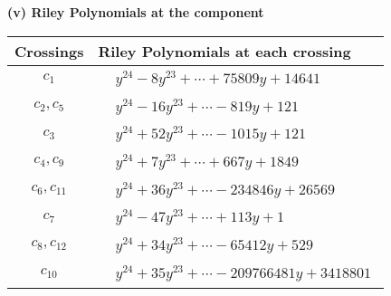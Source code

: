 \documentclass[1p]{elsarticle_modified}
\theoremstyle{definition}
\begin{document}
\newpage\renewcommand{\arraystretch}{1}
\flushleft \textbf{(v) Riley Polynomials at the component}\newline \\
\begin{tabular}{m{50pt}|m{274pt}}
Crossings & \hspace{64pt}Riley Polynomials at each crossing \\
\hline $$\begin{aligned}c_{1}\end{aligned}$$&$\begin{aligned}
&y^{24}-8 y^{23}+\cdots+75809 y+14641
\end{aligned}$\\
\hline $$\begin{aligned}c_{2},c_{5}\end{aligned}$$&$\begin{aligned}
&y^{24}-16 y^{23}+\cdots-819 y+121
\end{aligned}$\\
\hline $$\begin{aligned}c_{3}\end{aligned}$$&$\begin{aligned}
&y^{24}+52 y^{23}+\cdots-1015 y+121
\end{aligned}$\\
\hline $$\begin{aligned}c_{4},c_{9}\end{aligned}$$&$\begin{aligned}
&y^{24}+7 y^{23}+\cdots+667 y+1849
\end{aligned}$\\
\hline $$\begin{aligned}c_{6},c_{11}\end{aligned}$$&$\begin{aligned}
&y^{24}+36 y^{23}+\cdots-234846 y+26569
\end{aligned}$\\
\hline $$\begin{aligned}c_{7}\end{aligned}$$&$\begin{aligned}
&y^{24}-47 y^{23}+\cdots+113 y+1
\end{aligned}$\\
\hline $$\begin{aligned}c_{8},c_{12}\end{aligned}$$&$\begin{aligned}
&y^{24}+34 y^{23}+\cdots-65412 y+529
\end{aligned}$\\
\hline $$\begin{aligned}c_{10}\end{aligned}$$&$\begin{aligned}
&y^{24}+35 y^{23}+\cdots-209766481 y+3418801
\end{aligned}$\\
\hline
\end{tabular}\\~\\
\end{document}

